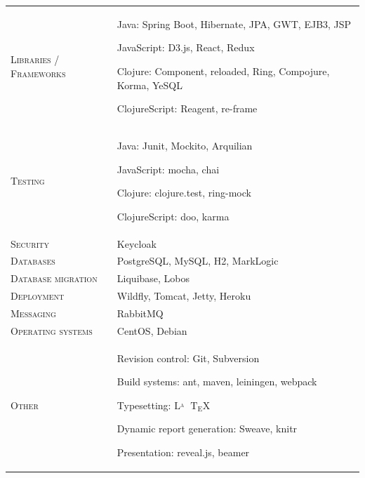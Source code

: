 \documentclass[a4paper, oneside, final]{scrartcl}
\newcommand{\gray}{\rowcolor[gray]{.90}}
\begin{document}
\begin{center}
\begin{tabularx}{0.97\linewidth}{>{\raggedleft\scshape}p{2cm}X}
    \gray Libraries / Frameworks & {Java: Spring Boot, Hibernate, JPA, GWT, EJB3, JSP %
    
                                    JavaScript: D3.js, React, Redux %

                                    Clojure: Component, reloaded, Ring, Compojure, Korma, YeSQL %

                                    ClojureScript: Reagent, re-frame
 
                                   }\\ 

 \gray Testing & {Java: Junit, Mockito, Arquilian 
 
                  JavaScript: mocha, chai
                   
                  Clojure: clojure.test, ring-mock

                  ClojureScript: doo, karma
 }\\ 

    \gray Security & {Keycloak}\\ 

    \gray Databases & {PostgreSQL, MySQL, H2, MarkLogic}\\ 

    \gray Database migration & {Liquibase, Lobos}\\ 

    \gray Deployment & {Wildfly, Tomcat, Jetty, Heroku}\\ 

    \gray Messaging & {RabbitMQ}\\ 

    \gray Operating systems & {CentOS, Debian}\\ 
     
    \gray Other & {Revision control: Git, Subversion

                    
                    Build systems: ant, maven, leiningen, webpack   
                    
                    Typesetting: $\mathrm{L\!\!^{_{{\scriptstyle A}}}\!\!\!\!\!\;\; T\!_{{\displaystyle E}}\! X}$     
                    
                    Dynamic report generation: Sweave, knitr 

                    Presentation: reveal.js, beamer                    

}
\end{tabularx}
\end{center}
\end{document}
